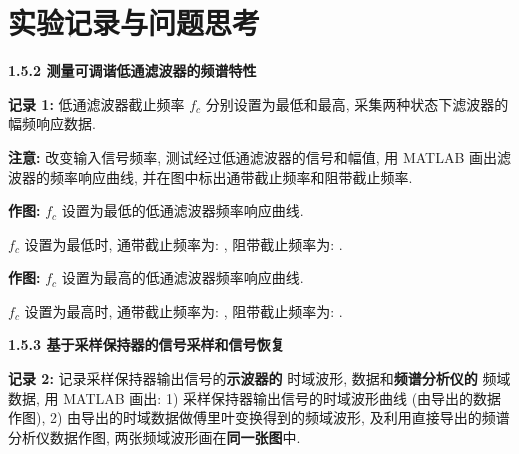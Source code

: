 \documentclass{dspreport}
\begin{document}
\maketitle

\section{实验记录与问题思考}
\textbf{1.5.2 测量可调谐低通滤波器的频谱特性}

\textbf{记录 1:} 低通滤波器截止频率 $f_c$ 分别设置为最低和最高, 采集两种状态下滤波器的幅频响应数据.

\textbf{注意:} 改变输入信号频率, 测试经过低通滤波器的信号和幅值, 用 MATLAB 画出滤波器的频率响应曲线, 并在图中标出通带截止频率和阻带截止频率.

\textbf{作图:} $f_c$ 设置为最低的低通滤波器频率响应曲线.

\begin{figure}[H]
    \centering
\end{figure}

$f_c$ 设置为最低时, 通带截止频率为: \underline{\blank{  }}, 阻带截止频率为: \underline{\blank{  }}.

\textbf{作图:} $f_c$ 设置为最高的低通滤波器频率响应曲线.

\begin{block}

\end{block}

\begin{figure}[H]
    \centering
\end{figure}

\begin{block}

\end{block}

$f_c$ 设置为最高时, 通带截止频率为: \underline{\blank{  }}, 阻带截止频率为: \underline{\blank{  }}.

\textbf{1.5.3 基于采样保持器的信号采样和信号恢复}

\textbf{记录 2:} 记录采样保持器输出信号的\textbf{示波器的}{\color{red} 时域波形, 数据}和\textbf{频谱分析仪的}{\color{red} 频域数据}, 用 MATLAB 画出:
1) 采样保持器输出信号的时域波形曲线 (由导出的数据作图), 2) 由导出的时域数据做傅里叶变换得到的频域波形, 及利用直接导出的频谱分析仪数据作图, 两张频域波形画在\textbf{同一张图}中.
\end{document}
